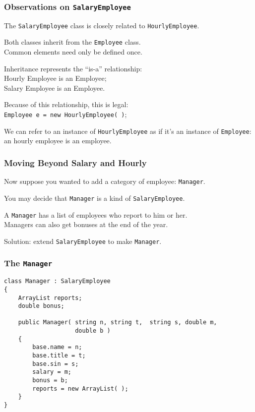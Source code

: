 \begin{frame}
\frametitle{Observations on \texttt{SalaryEmployee}}

The \texttt{SalaryEmployee} class is closely related to \texttt{HourlyEmployee}.

Both classes inherit from the \texttt{Employee} class.\\
\quad Common elements need only be defined once.

Inheritance represents the ``is-a'' relationship:\\
\quad Hourly Employee is an Employee;\\
\quad Salary Employee is an Employee.

Because of this relationship, this is legal:\\
\quad \texttt{Employee e = new HourlyEmployee( )};

We can refer to an instance of \texttt{HourlyEmployee} as if it's an instance of \texttt{Employee}: an hourly employee is an employee.

\end{frame}

\begin{frame}
\frametitle{Moving Beyond Salary and Hourly}
Now suppose you wanted to add a category of employee: \texttt{Manager}.

You may decide that \texttt{Manager} is a kind of \texttt{SalaryEmployee}.

A \texttt{Manager} has a list of employees who report to him or her.\\
Managers can also get bonuses at the end of the year.

Solution: extend \texttt{SalaryEmployee} to make \texttt{Manager}.

\end{frame}

\begin{frame}[fragile]
\frametitle{The \texttt{Manager}}

{\small
\begin{verbatim}
class Manager : SalaryEmployee
{
    ArrayList reports;
    double bonus;

    public Manager( string n, string t,  string s, double m,
                    double b )
    {
        base.name = n;
        base.title = t;
        base.sin = s;
        salary = m;
        bonus = b;
        reports = new ArrayList( );
    }
}
\end{verbatim}
}
\end{frame}

